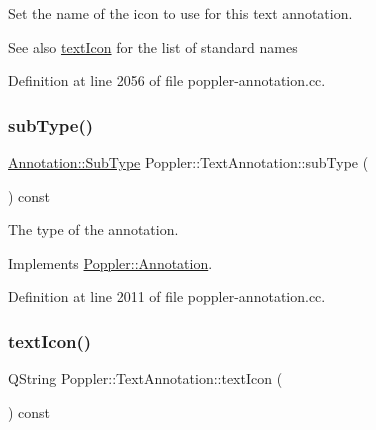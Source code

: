Set the name of the icon to use for this text annotation.

\begin{DoxySeeAlso}{See also}
\hyperlink{class_poppler_1_1_text_annotation_a1d54335a003edf713781fa43fc5f4ac5}{text\+Icon} for the list of standard names 
\end{DoxySeeAlso}


Definition at line 2056 of file poppler-\/annotation.\+cc.

\mbox{\label{class_poppler_1_1_text_annotation_aa2c1926b6e06b1527a43f651fea34aaa}} 
\subsubsection{\texorpdfstring{sub\+Type()}{subType()}}
{\footnotesize\ttfamily \hyperlink{class_poppler_1_1_annotation_a2d592999c330949d64679cfa9e81113f}{Annotation\+::\+Sub\+Type} Poppler\+::\+Text\+Annotation\+::sub\+Type (\begin{DoxyParamCaption}{ }\end{DoxyParamCaption}) const\hspace{0.3cm}{\ttfamily [virtual]}}

The type of the annotation. 

Implements \hyperlink{class_poppler_1_1_annotation_aef7fa1532193b41fbeba6e577579d984}{Poppler\+::\+Annotation}.



Definition at line 2011 of file poppler-\/annotation.\+cc.

\mbox{\label{class_poppler_1_1_text_annotation_a1d54335a003edf713781fa43fc5f4ac5}} 
\subsubsection{\texorpdfstring{text\+Icon()}{textIcon()}}
{\footnotesize\ttfamily Q\+String Poppler\+::\+Text\+Annotation\+::text\+Icon (\begin{DoxyParamCaption}{ }\end{DoxyParamCaption}) const}

